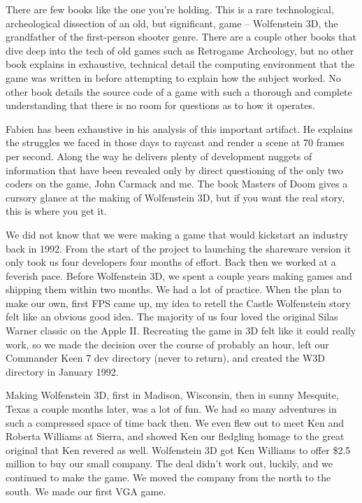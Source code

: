 There are few books like the one you're holding. This is a rare technological, archeological dissection of an old, but significant, game -- Wolfenstein 3D, the grandfather of the first-person shooter genre. There are a couple other books that dive deep into the tech of old games such as Retrogame Archeology, but no other book explains in exhaustive, technical detail the computing environment that the game was written in before attempting to explain how the subject worked. No other book details the source code of a game with such a thorough and complete understanding that there is no room for questions as to how it operates.\\
\par
Fabien has been exhaustive in his analysis of this important artifact. He explains the struggles we faced in those days to raycast and render a scene at 70 frames per second. Along the way he delivers plenty of development nuggets of information that have been revealed only by direct questioning of the only two coders on the game, John Carmack and me. The book Masters of Doom gives a cursory glance at the making of Wolfenstein 3D, but if you want the real story, this is where you get it.\\
\par
We did not know that we were making a game that would kickstart an industry back in 1992. From the start of the project to launching the shareware version it only took us four developers four months of effort. Back then we worked at a feverish pace. Before Wolfenstein 3D, we spent a couple years making games and shipping them within two months. We had a lot of practice. When the plan to make our own, first FPS came up, my idea to retell the Castle Wolfenstein story felt like an obvious good idea. The majority of us four loved the original Silas Warner classic on the Apple II. Recreating the game in 3D felt like it could really work, so we made the decision over the course of probably an hour, left our Commander Keen 7 dev directory (never to return), and created the W3D directory in January 1992.\\
\par
Making Wolfenstein 3D, first in Madison, Wisconsin, then in sunny Mesquite, Texas a couple months later, was a lot of fun. We had so many adventures in such a compressed space of time back then. We even flew out to meet Ken and Roberta Williams at Sierra, and showed Ken our fledgling homage to the great original that Ken revered as well. Wolfenstein 3D got Ken Williams to offer \$2.5 million to buy our small company. The deal didn't work out, luckily, and we continued to make the game. We moved the company from the north to the south. We made our first VGA game.\\
